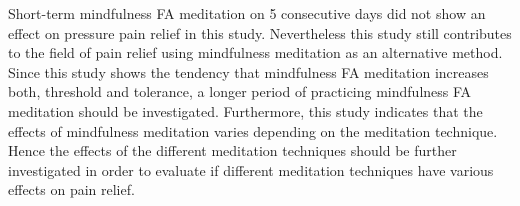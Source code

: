 Short-term mindfulness FA meditation on 5 consecutive days did not show an effect on pressure pain relief in this study. Nevertheless this study still contributes to the field of pain relief using mindfulness meditation as an alternative method. Since this study shows the tendency that mindfulness FA meditation increases both, threshold and tolerance, a longer period of practicing mindfulness FA meditation should be investigated. Furthermore, this study indicates that the effects of mindfulness meditation varies depending on the meditation technique. Hence the effects of the different meditation techniques should be further investigated in order to evaluate if different meditation techniques have various effects on pain relief. 